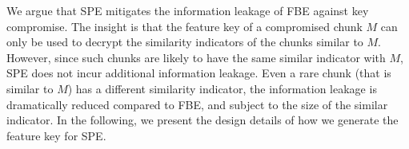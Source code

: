 We argue that SPE  mitigates the information leakage of FBE against key compromise. The insight is that the feature key of a compromised chunk $M$ can only be used to decrypt the similarity indicators of the  chunks similar to $M$. However, since such chunks are likely to have the same similar indicator with $M$, SPE does not incur additional information leakage. Even a rare chunk (that is similar to $M$) has a different similarity indicator, the information leakage is dramatically reduced compared to FBE, and subject to the size of the similar indicator.
In the following, we present the design details of how we generate the feature key for SPE.








